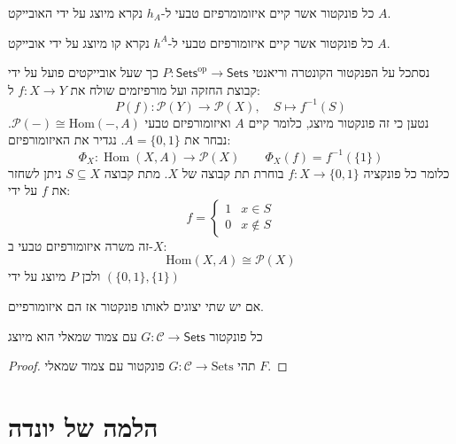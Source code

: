 \documentclass{tstextbook}
\begin{document}
\begin{definition}
כל פונקטור אשר קיים איזומומרפיזם טבעי ל-\(h_{A}\) נקרא מיוצג על ידי האובייקט \(A\).

\end{definition}
\begin{definition}
כל פונקטור אשר קיים איזומורפיזם טבעי ל-\(h^{A}\) נקרא קו מיוצג על ידי אובייקט \(A\).

\end{definition}
\begin{example}
נסתכל על הפנקטור הקונטרה וריאנטי \(P:\mathsf{Sets}^{\mathrm{op}}\to \mathsf{Sets}\) כך שעל אובייקטים פועל על ידי קבוצת החזקה ועל מורפיזמים שולח את \(f:X\to Y\) ל:
$$P(f):{\mathcal{P}}(Y)\to{\mathcal{P}}(X),\quad S\mapsto f^{-1}(S)$$
נטען כי זה פונקטור מיוצג, כלומר קיים \(A\) ואיזומורפיזם טבעי \(\mathcal{P}(-)\cong \mathrm{Hom}(-,A)\). נבחר את \(A=\{ 0,1 \}\). נגדיר את האיזומורפיזם:
$$\Phi_{X}\colon\operatorname{Hom}(X,A)\longrightarrow{\mathcal{P}}(X)\qquad \Phi_{X}(f)=f^{-1}(\{1\})$$
כלומר כל פונקציה \(f:X\to \{ 0,1 \}\) בוחרת תת קבוצה של \(X\). מתת קבוצה \(S\subseteq X\) ניתן לשחזר את \(f\) על ידי:
$$f=\begin{cases}1 & x \in S \\0 & x \not \in S
\end{cases}$$
זה משרה איזומורפיזם טבעי ב-\(X\):
$${\mathrm{Hom}}(X,A)\cong{\mathcal{P}}(X)$$
ולכן \(P\) מיוצג על ידי \(\left( \{ 0,1 \},\{ 1 \} \right)\)

\end{example}
\begin{proposition}
אם יש שתי יצוגים לאותו פונקטור אז הם איזומורפיים.

\end{proposition}
\begin{proposition}
כל פונקטור \(G:\mathcal{C}\to \mathsf{Sets}\) עם צמוד שמאלי הוא מיוצג

\end{proposition}
\begin{proof}
תהי \(G:\mathcal{C}\to \mathrm{Sets}\) פונקטור עם צמוד שמאלי \(F\). 

\end{proof}
\begin{definition}
\end{definition}
\section{הלמה של יונדה}
\end{document}
